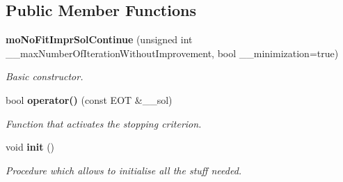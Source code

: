 \subsection*{Public Member Functions}
\begin{CompactItemize}
\item 
{\bf moNoFitImprSolContinue} (unsigned int \_\-\_\-maxNumberOfIterationWithoutImprovement, bool \_\-\_\-minimization=true)
\begin{CompactList}\small\item\em Basic constructor. \item\end{CompactList}\item 
bool {\bf operator()} (const EOT \&\_\-\_\-sol)
\begin{CompactList}\small\item\em Function that activates the stopping criterion. \item\end{CompactList}\item 
void {\bf init} ()\label{classmo_no_fit_impr_sol_continue_21641c0a38a4501baae6133cbc591de4}

\begin{CompactList}\small\item\em Procedure which allows to initialise all the stuff needed. \item\end{CompactList}\end{CompactItemize}
